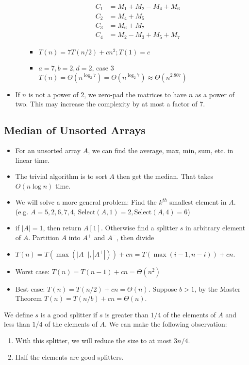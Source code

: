 \documentclass[a4paper]{article}
\begin{document}
\begin{itemize}
\begin{enumerate}
        \begin{align}
            C_1 &= M_1+M_2-M_4+M_6\\
            C_2 &= M_4+M_5\\
            C_3 &= M_6+M_7\\
            C_4 &= M_2-M_3+M_5+M_7
        \end{align}
        \begin{itemize}
            \item $T(n)=7T(n/2)+cn^2; T(1)=c$
            \item $a=7,b=2,d=2$, case 3 $T(n)=\Theta(n^{\log_2 7})=\Theta(n^{\log_2 7})\approx\Theta(n^{2.807})$
        \end{itemize}
    \end{enumerate}
    \item If $n$ is not a power of 2, we zero-pad the matrices to have $n$ as a power of two. This may increase the complexity by at most a factor of 7.
\end{itemize}

\subsection{Median of Unsorted Arrays}
\begin{itemize}
    \item For an unsorted array $A$, we can find the average, max, min, sum, etc. in linear time.
    \item The trivial algorithm is to sort $A$ then get the median. That takes $O(n\log n)$ time.
    \item We will solve a more general problem: Find the $k^{th}$ smallest element in $A$. (e.g. $A=5,2,6,7,4$, $\mathrm{Select}(A,1)=2, \mathrm{Select}(A,4)=6$)
    \item if $|A|=1$, then return $A[1]$. Otherwise find a splitter $s$ in arbitrary element of $A$. Partition $A$ into $A^+$ and $A^-$, then divide 
    \item $T(n)=T(\max(|A^-|,|A^+|))+cn=T(\max(i-1,n-i))+cn$.
    \item Worst case: $T(n)=T(n-1)+cn=\Theta(n^2)$
    \item Best case: $T(n)=T(n/2)+cn=\Theta(n)$. Suppose $b>1$, by the Master Theorem $T(n)=T(n/b)+cn=\Theta(n)$.
\end{itemize}

We define $s$ is a good splitter if $s$ is greater than $1/4$ of the elements of $A$ and less than $1/4$ of the elements of $A$. We can make the following observation:
\begin{enumerate}
    \item With this splitter, we will reduce the size to at most $3n/4$.
    \item Half the elements are good splitters.
\end{enumerate}
\end{document}

